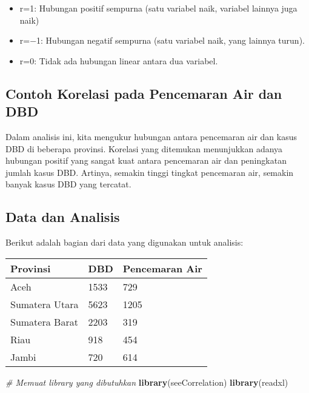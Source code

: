 \documentclass[
]{article}
\newenvironment{Shaded}{\begin{snugshade}}{\end{snugshade}}
\newcommand{\CommentTok}[1]{\textcolor[rgb]{0.56,0.35,0.01}{\textit{#1}}}
\newcommand{\FunctionTok}[1]{\textcolor[rgb]{0.13,0.29,0.53}{\textbf{#1}}}
\newcommand{\NormalTok}[1]{#1}
\providecommand{\tightlist}{%
  \setlength{\itemsep}{0pt}\setlength{\parskip}{0pt}}
\begin{document}
\begin{itemize}
\tightlist
\item
  r=1: Hubungan positif sempurna (satu variabel naik, variabel lainnya
  juga naik)
\item
  r=−1: Hubungan negatif sempurna (satu variabel naik, yang lainnya
  turun).
\item
  r=0: Tidak ada hubungan linear antara dua variabel.
\end{itemize}

\hypertarget{contoh-korelasi-pada-pencemaran-air-dan-dbd}{%
\subsection{Contoh Korelasi pada Pencemaran Air dan
DBD}\label{contoh-korelasi-pada-pencemaran-air-dan-dbd}}

Dalam analisis ini, kita mengukur hubungan antara pencemaran air dan
kasus DBD di beberapa provinsi. Korelasi yang ditemukan menunjukkan
adanya hubungan positif yang sangat kuat antara pencemaran air dan
peningkatan jumlah kasus DBD. Artinya, semakin tinggi tingkat pencemaran
air, semakin banyak kasus DBD yang tercatat.

\hypertarget{data-dan-analisis}{%
\subsection{Data dan Analisis}\label{data-dan-analisis}}

Berikut adalah bagian dari data yang digunakan untuk analisis:

\begin{longtable}[]{@{}lll@{}}
\toprule\noalign{}
Provinsi & DBD & Pencemaran Air \\
\midrule\noalign{}
\endhead
\bottomrule\noalign{}
\endlastfoot
Aceh & 1533 & 729 \\
Sumatera Utara & 5623 & 1205 \\
Sumatera Barat & 2203 & 319 \\
Riau & 918 & 454 \\
Jambi & 720 & 614 \\
\end{longtable}

\begin{Shaded}
\begin{Highlighting}[]
\CommentTok{\# Memuat library yang dibutuhkan}
\FunctionTok{library}\NormalTok{(seeCorrelation)}
\FunctionTok{library}\NormalTok{(readxl)}
\end{Highlighting}
\end{Shaded}
\end{document}
